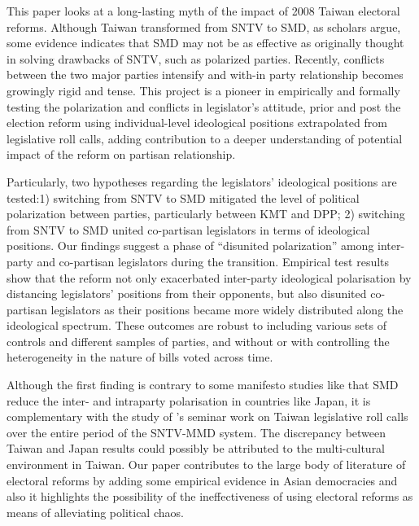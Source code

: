 This paper looks at a long-lasting myth of the impact of 2008 Taiwan electoral reforms. Although Taiwan transformed from SNTV to SMD, as scholars argue, some evidence indicates that SMD may not be as effective as originally thought in solving drawbacks of SNTV, such as polarized parties. Recently, conflicts between the two major parties
intensify and with-in party relationship becomes growingly rigid and tense. This project is a pioneer in empirically and formally testing the polarization and conflicts in legislator's attitude, prior and post the election reform using individual-level ideological positions extrapolated from legislative roll calls, adding contribution to a deeper understanding of potential impact of the reform on partisan relationship. 

Particularly, two hypotheses regarding the legislators' ideological positions are tested:1) switching from SNTV to SMD mitigated the level of political polarization between parties, particularly between
KMT and DPP; 2) switching from SNTV to SMD united co-partisan legislators in terms of ideological positions. Our findings suggest a phase of ``disunited polarization'' among inter-party and co-partisan legislators during the transition. Empirical test results show that the reform not only exacerbated inter-party ideological polarisation by distancing legislators' positions from their opponents, but also disunited co-partisan legislators as their positions became more widely distributed along the ideological spectrum. These outcomes are robust to including various sets of controls and different samples of parties, and without or with controlling the heterogeneity in the nature of bills voted across time.

Although the first finding is contrary to some manifesto studies like \citet{Catalinac2017} that SMD reduce the inter- and intraparty polarisation in countries like Japan, it is complementary with the study of \citet{Jang2019}'s seminar work on Taiwan legislative roll calls over the entire period of the SNTV-MMD system. The discrepancy between Taiwan and Japan results could possibly be attributed to the multi-cultural environment in Taiwan. Our paper contributes to the large body of literature of electoral reforms by adding some empirical evidence in Asian democracies and also it highlights the possibility of the ineffectiveness of using electoral reforms as means of alleviating political chaos.